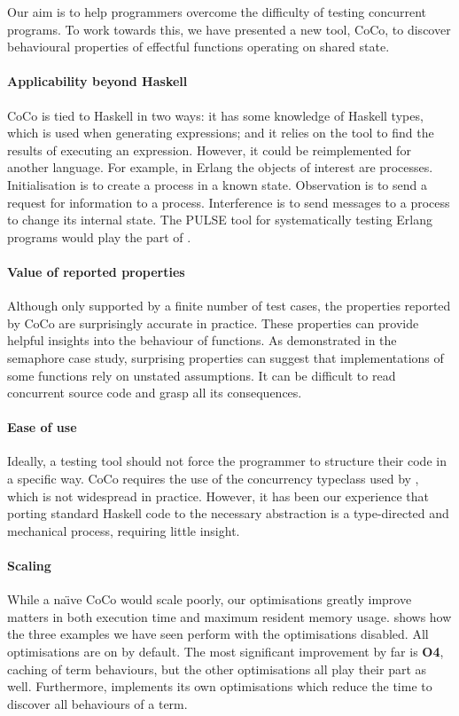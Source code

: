 Our aim is to help programmers overcome the difficulty of testing
concurrent programs.  To work towards this, we have presented a new
tool, CoCo, to discover behavioural properties of effectful functions
operating on shared state.

\paragraph{Applicability beyond Haskell}
CoCo is tied to Haskell in two ways: it has some knowledge of Haskell
types, which is used when generating expressions; and it relies on the
\dejafu{} tool to find the results of executing an expression.
However, it could be reimplemented for another language.  For example,
in Erlang the objects of interest are processes.  Initialisation is to
create a process in a known state.  Observation is to send a request
for information to a process.  Interference is to send messages to a
process to change its internal state.  The PULSE tool for
systematically testing Erlang programs\cite{claessen2009} would play
the part of \dejafu{}.

\paragraph{Value of reported properties}
Although only supported by a finite number of test cases, the
properties reported by CoCo are surprisingly accurate in practice.
These properties can provide helpful insights into the behaviour of
functions.  As demonstrated in the semaphore case study, surprising
properties can suggest that implementations of some functions rely on
unstated assumptions.  It can be difficult to read concurrent source
code and grasp all its consequences.

\paragraph{Ease of use}
Ideally, a testing tool should not force the programmer to structure
their code in a specific way.  CoCo requires the use of the
concurrency typeclass used by \dejafu{}, which is not widespread in
practice.  However, it has been our experience that porting standard
Haskell code to the necessary abstraction is a type-directed and
mechanical process, requiring little insight.

\paragraph{Scaling}
While a na\"{\i}ve CoCo would scale poorly, our optimisations greatly
improve matters in both execution time and maximum resident memory
usage.   shows how the three examples we have
seen perform with the optimisations disabled.  All optimisations are
on by default.  The most significant improvement by far is
\textbf{O4}, caching of term behaviours, but the other optimisations
all play their part as well.  Furthermore, \dejafu{} implements its
own optimisations which reduce the time to discover all behaviours of
a term.

